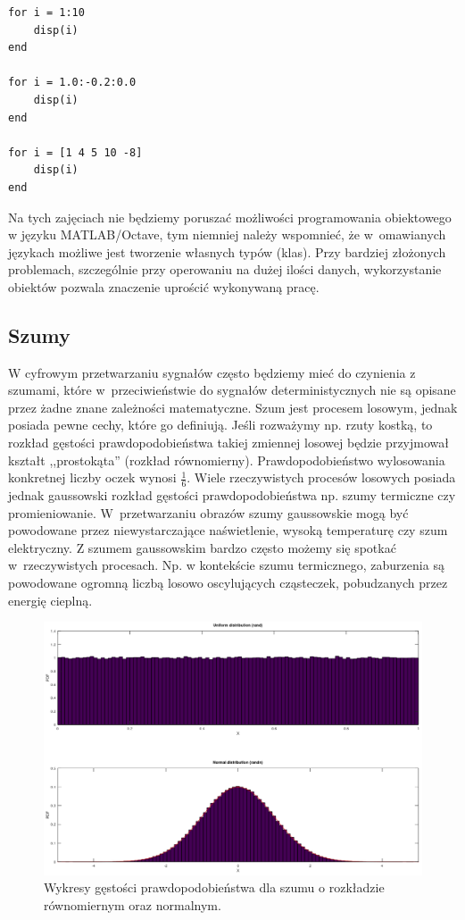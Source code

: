 \begin{lstlisting}[caption=Trzy pętle \texttt{for} wykonujące się na różnych przedziałach wektora \texttt{i}, label=lab1/lst/forLoop]
for i = 1:10
	disp(i)
end

for i = 1.0:-0.2:0.0
	disp(i)
end

for i = [1 4 5 10 -8]
	disp(i)
end
\end{lstlisting} 

Na tych zajęciach nie będziemy poruszać możliwości programowania obiektowego w języku MATLAB/Octave, tym niemniej należy wspomnieć, że w~omawianych językach możliwe jest tworzenie własnych typów (klas). Przy bardziej złożonych problemach, szczególnie przy operowaniu na dużej ilości danych, wykorzystanie obiektów pozwala znaczenie uprościć wykonywaną pracę.





\subsection{Szumy}\label{lab1/sec/noises}

W cyfrowym przetwarzaniu sygnałów często będziemy mieć do czynienia z szumami, które w~przeciwieństwie do sygnałów deterministycznych nie są opisane przez żadne znane zależności matematyczne. Szum jest procesem losowym, jednak posiada pewne cechy, które go definiują. Jeśli rozważymy np. rzuty kostką, to rozkład gęstości prawdopodobieństwa takiej zmiennej losowej będzie przyjmował kształt ,,prostokąta'' (rozkład równomierny). Prawdopodobieństwo wylosowania konkretnej liczby oczek wynosi $\frac{1}{6}$. Wiele rzeczywistych procesów losowych posiada jednak gaussowski rozkład gęstości prawdopodobieństwa np. szumy termiczne czy promieniowanie. W~przetwarzaniu obrazów szumy gaussowskie mogą być powodowane przez niewystarczające naświetlenie, wysoką temperaturę czy szum elektryczny. Z szumem gaussowskim bardzo często możemy się spotkać w~rzeczywistych procesach. Np. w kontekście szumu termicznego, zaburzenia są powodowane ogromną liczbą losowo oscylujących cząsteczek, pobudzanych przez energię cieplną.

\begin{figure}[hbt!]
	\centering
	\includegraphics[width=0.9\linewidth]{images/whiteNoisePdf}
	\caption{Wykresy gęstości prawdopodobieństwa dla szumu o rozkładzie równomiernym oraz normalnym.}
	\label{lab1/fig/whiteNoisesPdf}
\end{figure}


